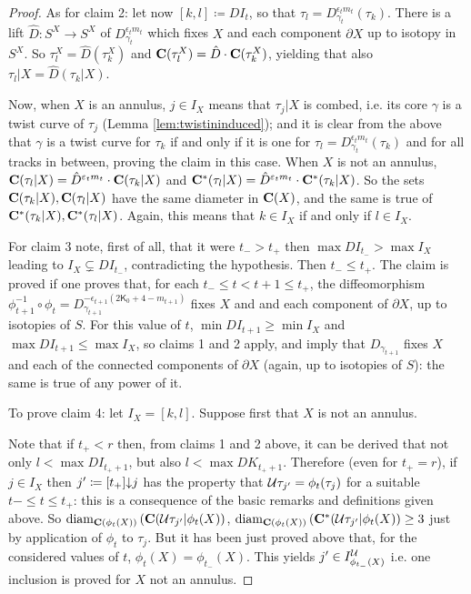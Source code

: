 \begin{proof}
As for claim 2: let now $[k,l]\coloneqq DI_t$, so that $\tau_l=D_{\gamma_t}^{\epsilon_t m_t}(\tau_k)$. There is a lift $\hat D: S^X\rightarrow S^X$ of $D_{\gamma_t}^{\epsilon_t m_t}$ which fixes $X$ and each component $\partial X$ up to isotopy in $S^X$. So $\tau_l^X= \hat D(\tau_k^X)$ and $\mathbf C(\tau_l^X)= \hat D\cdot \mathbf C(\tau_k^X)$, yielding that also $\tau_l|X=\hat D(\tau_k|X)$. 

Now, when $X$ is an annulus, $j\in I_X$ means that $\tau_j|X$ is combed, i.e. its core $\gamma$ is a twist curve of $\tau_j$ (Lemma \ref{lem:twistininduced}); and it is clear from the above that $\gamma$ is a twist curve for $\tau_k$ if and only if it is one for $\tau_l=D_{\gamma_t}^{\epsilon_t m_t}(\tau_k)$ and for all tracks in between, proving the claim in this case. When $X$ is not an annulus, $\mathbf C(\tau_l|X)=\hat D^{\varepsilon_t m_t}\cdot\mathbf C(\tau_k|X)$ and $\mathbf C^*(\tau_l|X)=\hat D^{\varepsilon_t m_t}\cdot\mathbf C^*(\tau_k|X)$. So the sets $\mathbf C(\tau_k|X), \mathbf C(\tau_l|X)$ have the same diameter in $\mathbf C(X)$, and the same is true of $\mathbf C^*(\tau_k|X), \mathbf C^*(\tau_l|X)$. Again, this means that $k\in I_X$ if and only if $l\in I_X$.

For claim 3 note, first of all, that it were $t_->t_+$ then $\max DI_{t_-}> \max I_X$ leading to $I_X\subsetneq DI_{t_-}$, contradicting the hypothesis.  Then $t_-\leq t_+$. The claim is proved if one proves that, for each $t_-\leq t<t+1\leq t_+$, the diffeomorphism $\phi_{t+1}^{-1}\circ\phi_t=D_{\gamma_{t+1}}^{-\epsilon_{t+1}(2\mathsf{K}_0+4-m_{t+1})}$ fixes $X$ and and each component of $\partial X$, up to isotopies of $S$. For this value of $t$, $\min DI_{t+1}\geq \min I_X$ and $\max DI_{t+1}\leq \max I_X$, so claims 1 and 2 apply, and imply that $D_{\gamma_{t+1}}$ fixes $X$ and each of the connected components of $\partial X$ (again, up to isotopies of $S$): the same is true of any power of it.

To prove claim 4: let $I_X=[k,l]$. Suppose first that $X$ is not an annulus. 

Note that if $t_+<r$ then, from claims 1 and 2 above, it can be derived that not only $l<\max DI_{t_+ +1}$, but also $l<\max DK_{t_+ +1}$. Therefore (even for $t_+=r$), if $j\in I_X$ then $j'\coloneqq [t_+]\mathord{\downarrow} j$ has the property that ${\mathcal U}\tau_{j'}=\phi_t(\tau_j)$ for a suitable $t-\leq t\leq t_+$: this is a consequence of the basic remarks and definitions given above. So $\mathrm{diam}_{\mathbf C\left(\phi_t(X)\right)}\left(\mathbf C({\mathcal U}\tau_{j'}|\phi_t(X)\right)$, $\mathrm{diam}_{\mathbf C\left(\phi_t(X)\right)}\left(\mathbf C^*({\mathcal U}\tau_{j'}|\phi_t(X)\right)\geq 3$ just by application of $\phi_t$ to $\tau_j$. But it has been just proved above that, for the considered values of $t$, $\phi_t(X)=\phi_{t_-}(X)$. This yields $j'\in I_{\phi_{t_-}(X)}^{\mathcal U}$ i.e. one inclusion is proved for $X$ not an annulus.


\end{proof}
